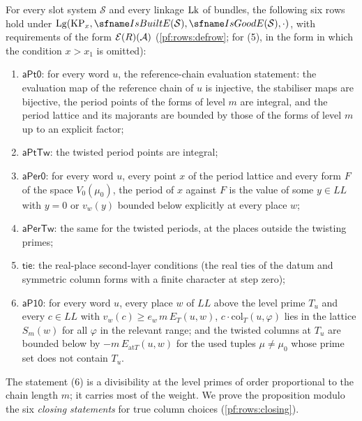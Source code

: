 \begin{proposition}\label{pf:rows:periods}
For every slot system $\mathcal S$ and every linkage $\mathrm{Lk}$ of bundles, the following six rows hold under
$\rowsLg(\rowsKPx,\rowsBuilt(\mathcal S),\rowsGood(\mathcal S),\cdot)$, with requirements of the form
$\mathcal{E}(R)(\mathcal A)$ (\cref{pf:rows:defrow}; for (5), in the form in which the condition $x>x_1$ is omitted):
\begin{enumerate}[label=(\arabic*)]
\item $\mathsf{aPt0}$: for every word $u$, the reference-chain evaluation statement: the evaluation map of the reference
chain of $u$ is injective, the stabiliser maps are bijective, the period points of the forms of level $m$ are integral,
and the period lattice and its majorants are bounded by those of the forms of level $m$ up to an explicit factor;
\item $\mathsf{aPtTw}$: the twisted period points are integral;
\item $\mathsf{aPer0}$: for every word $u$, every point $x$ of the period lattice and every form $F$ of the space
$V_0(\mu_0)$, the period of $x$ against $F$ is the value of some $y\in\mathit{LL}$ with $y=0$ or $v_w(y)$ bounded below
explicitly at every place $w$;
\item $\mathsf{aPerTw}$: the same for the twisted periods, at the places outside the twisting primes;
\item $\mathsf{tie}$: the real-place second-layer conditions (the real ties of the datum and symmetric column forms with a
finite character at step zero);
\item $\mathsf{aP10}$: for every word $u$, every place $w$ of $\mathit{LL}$ above the level prime $T_u$ and every
$c\in\mathit{LL}$ with $v_w(c)\ge e_w\,m\,E_T(u,w)$, $c\cdot\mathrm{col}_T(u,\varphi)$ lies in the lattice $S_m(w)$ for all
$\varphi$ in the relevant range; and the twisted columns at $T_u$ are bounded below by $-m\,E_{\mathrm{at}T}(u,w)$ for the used
tuples $\mu\ne\mu_0$ whose prime set does not contain $T_u$.
\end{enumerate}
\end{proposition}

The statement (6) is a divisibility at the level primes of order proportional to the chain length $m$; it carries most
of the weight. We prove the proposition modulo the six \emph{closing statements} for true column choices
(\cref{pf:rows:closing}).


